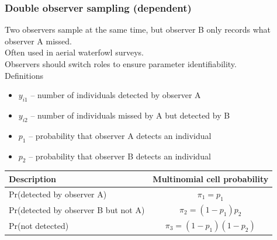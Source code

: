 \documentclass[color=usenames,dvipsnames]{beamer}\usepackage[]{graphicx}\usepackage[]{xcolor}
\begin{document}
\begin{frame}
  \frametitle{Double observer sampling (dependent)}
  \small
  Two observers sample at the same time, but observer B only records
  what observer A missed. \\
  \pause
  \vfill
  Often used in aerial waterfowl surveys. \\
  \pause
  \vfill
  Observers should switch roles to ensure parameter identifiability. \\
  \pause
  \vfill
  Definitions
  \begin{itemize}
    \setlength\itemsep{1pt}
    \item $y_{i1}$ -- number of individuals detected by observer A
    \item $y_{i2}$ -- number of individuals missed by A but
      detected by B
    \item $p_1$ -- probability that observer A detects an individual 
    \item $p_2$ -- probability that observer B detects an individual 
  \end{itemize}
  \pause \vfill
  \footnotesize
  \begin{tabular}{lc}
    \hline
    \centering
    Description & Multinomial cell probability \\
    \hline
    Pr(detected by observer A) & $\pi_1 = p_1$ \\
    Pr(detected by observer B but not A) & $\pi_2 = (1-p_1)p_2$ \\
    Pr(not detected) & $\pi_3 = (1-p_1)(1-p_2)$ \\
    \hline
  \end{tabular}
\end{frame}






\end{document}

